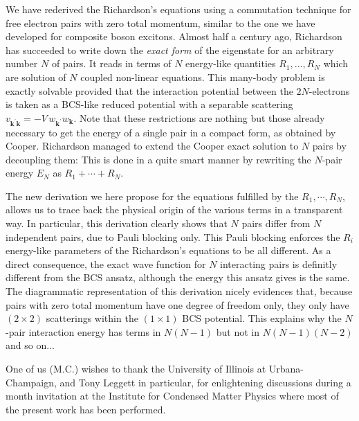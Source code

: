 \documentclass[aps,prb,superscriptaddress,twocolumn]{revtex4}
\newcommand{\vk}{\ensuremath{\mathbf{k}}}
\begin{document}
We have rederived the Richardson's equations using a commutation technique for
free electron pairs with zero total momentum, similar to the one we have
developed for composite boson excitons. Almost half a century ago,
Richardson has succeeded to write down the \emph{exact form} of the eigenstate for an
arbitrary number $N$ of pairs. It reads in terms of $N$ energy-like
quantities $R_1,..., R_N$ which are solution of $N$ coupled non-linear
equations. This many-body problem is exactly solvable provided that the
interaction potential between the $2N$-electrons is taken as a BCS-like reduced potential with a separable
scattering $v_{\mathbf{k} ^{\prime}\mathbf{k} }=-V\,w_{\mathbf{k}
^{\prime}}w_{\mathbf{k} }$.
Note that these restrictions are nothing but those already necessary to get
the energy of a single pair in a compact form, as obtained by Cooper.
Richardson managed to extend the Cooper exact solution to $N$ pairs by
decoupling them: This is done in a quite smart manner by rewriting the $N$-pair energy $E_N$ as $R_1+\cdots+R_N$.

The new derivation we here propose for the equations fulfilled by the $R_1,\cdots,R_N$, allows us to trace back
the physical origin of the various terms in a transparent way. In
particular, this derivation clearly shows that $N$ pairs differ from $N$ independent
pairs, due to Pauli blocking only. This Pauli blocking
enforces the $R_i$ energy-like parameters of the Richardson's equations to be all different. As a direct consequence, the exact wave function for $N$ interacting pairs is definitly different from the BCS ansatz, although the energy this ansatz gives is the same. The diagrammatic
representation of this derivation nicely evidences that, because pairs
with zero total momentum have one degree of freedom only, they only have 
$(2\times2)$ scatterings within the $(1\times1)$ BCS potential. This explains
why the $N$-pair interaction energy has terms in $N(N-1)$ but not in $N(N-1)(N-2)
$ and so on...

One of us (M.C.) wishes to thank the University of Illinois at
Urbana-Champaign, and Tony Leggett in particular, for enlightening discussions during a month invitation at
the Institute for Condensed Matter Physics where most of the present work has been
performed.
\end{document}
